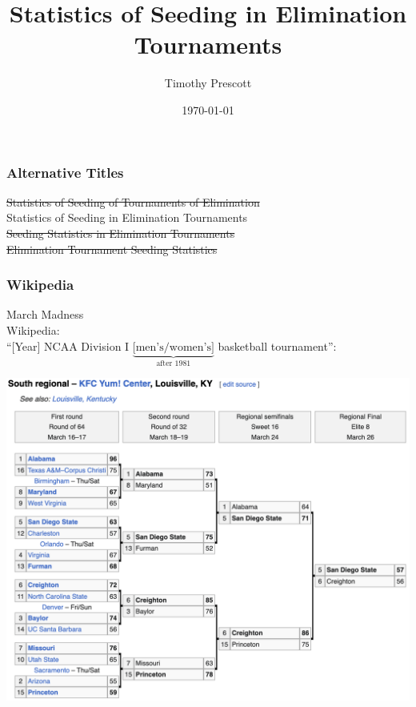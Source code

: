 \documentclass{beamer}
\title{Statistics of Seeding in Elimination Tournaments}
\author{Timothy Prescott}
\date{\today}
\begin{document}
\begin{frame}
\maketitle
\end{frame}

\begin{frame}
\frametitle{Alternative Titles}
\begin{center}\Large\color{blue}
\sout{Statistics of Seeding of Tournaments of Elimination}\\
Statistics of Seeding in Elimination Tournaments\\
\sout{Seeding Statistics in Elimination Tournaments}\\
\sout{Elimination Tournament Seeding Statistics}
\end{center}
\end{frame}

\begin{frame}
\frametitle{Wikipedia}
March Madness\\
Wikipedia:\\
``[Year] NCAA Division I $\underbrace{\text{[men's/women's]}}_{\text{after 1981}}$ basketball tournament'':
\end{frame}

\begin{frame}
\includegraphics[width=\linewidth]{../paper/2023bracket}
\end{frame}
\end{document}
